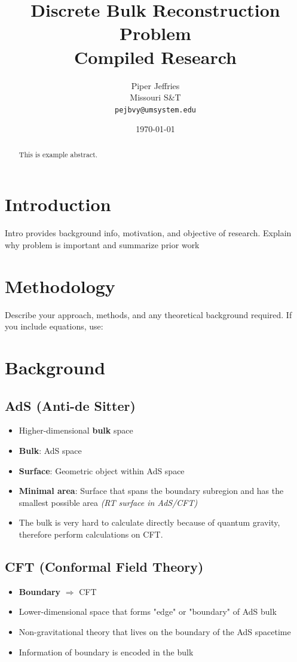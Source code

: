 \documentclass[12pt]{article}
\title{\textbf{Discrete Bulk Reconstruction Problem} \\ \large Compiled Research}
\author{Piper Jeffries \\ Missouri S\&T \\ \texttt{pejbvy@umsystem.edu}}
\date{\today}
\begin{document}
\maketitle

\begin{abstract}
    This is example abstract. 
\end{abstract}

\newpage 
\tableofcontents
\newpage

\section{Introduction}
    Intro provides background info, motivation, and objective of research. Explain why problem is important and summarize prior work

\section{Methodology}
Describe your approach, methods, and any theoretical background required. If you include equations, use:

\section*{Background}

\subsection*{AdS (Anti-de Sitter)}
\begin{itemize}
    \item Higher-dimensional \textbf{bulk} space
    \item \textbf{Bulk}: AdS space
    \item \textbf{Surface}: Geometric object within AdS space
    \item \textbf{Minimal area}: Surface that spans the boundary subregion and has the smallest possible area \textit{(RT surface in AdS/CFT)}
    \item The bulk is very hard to calculate directly because of quantum gravity, therefore perform calculations on CFT.
\end{itemize}

\subsection*{CFT (Conformal Field Theory)}
\begin{itemize}
    \item \textbf{Boundary} $\Rightarrow$ CFT
    \item Lower-dimensional space that forms "edge" or "boundary" of AdS bulk
    \item Non-gravitational theory that lives on the boundary of the AdS spacetime
    \item Information of boundary is encoded in the bulk
\end{itemize}
\end{document}
